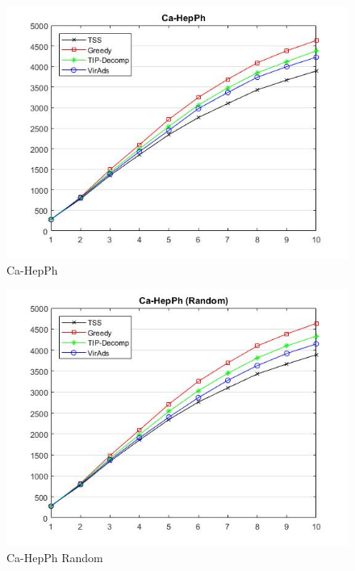 \begin{figure}
	\centering
	\includegraphics[scale=0.5]{images/ca-hepphresult.jpg}
	\caption{Ca-HepPh}
\end{figure}
\begin{figure}
\centering
	\includegraphics[scale=0.5]{images/ca-hepphresultrandom.jpg}
	\caption{Ca-HepPh Random}
	\end{figure}
